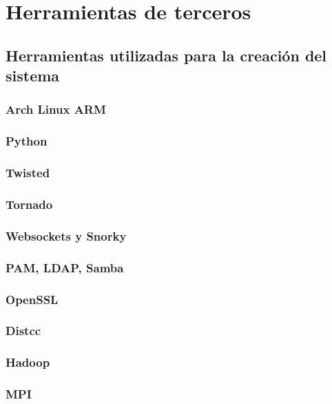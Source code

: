 \chapter{Herramientas de terceros}
\section{Herramientas utilizadas para la creación del sistema}

\subsection{Arch Linux ARM}

\subsection{Python}

\subsection{Twisted}

\subsection{Tornado}

\subsection{Websockets y Snorky}

\subsection{PAM, LDAP, Samba}

\subsection{OpenSSL}

\subsection{Distcc}

\subsection{Hadoop}

\subsection{MPI}

